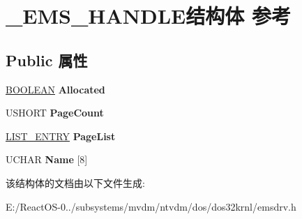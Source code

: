 \hypertarget{struct___e_m_s___h_a_n_d_l_e}{}\section{\+\_\+\+E\+M\+S\+\_\+\+H\+A\+N\+D\+L\+E结构体 参考}
\label{struct___e_m_s___h_a_n_d_l_e}
\subsection*{Public 属性}
\begin{DoxyCompactItemize}
\item 
\mbox{\label{struct___e_m_s___h_a_n_d_l_e_aa362896dcd59528adffec1c4b5380b29}} 
\hyperlink{_processor_bind_8h_a112e3146cb38b6ee95e64d85842e380a}{B\+O\+O\+L\+E\+AN} {\bfseries Allocated}
\item 
\mbox{\label{struct___e_m_s___h_a_n_d_l_e_a40b1bc102ff273cbc03630b50779933c}} 
U\+S\+H\+O\+RT {\bfseries Page\+Count}
\item 
\mbox{\label{struct___e_m_s___h_a_n_d_l_e_a785517f38528393d85708cf31e1eaabb}} 
\hyperlink{struct___l_i_s_t___e_n_t_r_y}{L\+I\+S\+T\+\_\+\+E\+N\+T\+RY} {\bfseries Page\+List}
\item 
\mbox{\label{struct___e_m_s___h_a_n_d_l_e_a35f61b69bbd3cfe261fdbea8692cabdb}} 
U\+C\+H\+AR {\bfseries Name} \mbox{[}8\mbox{]}
\end{DoxyCompactItemize}


该结构体的文档由以下文件生成\+:\begin{DoxyCompactItemize}
\item 
E\+:/\+React\+O\+S-\/0../subsystems/mvdm/ntvdm/dos/dos32krnl/emsdrv.\+h\end{DoxyCompactItemize}
